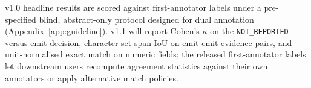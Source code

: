 \documentclass{article}
\newcommand{\NR}{\texttt{NOT\_REPORTED}}
\begin{document}
v1.0 headline results are scored against first-annotator labels under a pre-specified blind, abstract-only protocol designed for dual annotation (Appendix~\ref{app:guideline}). v1.1 will report Cohen's $\kappa$ on the \NR{}-versus-emit decision, character-set span IoU on emit-emit evidence pairs, and unit-normalised exact match on numeric fields; the released first-annotator labels let downstream users recompute agreement statistics against their own annotators or apply alternative match policies.





\end{document}
